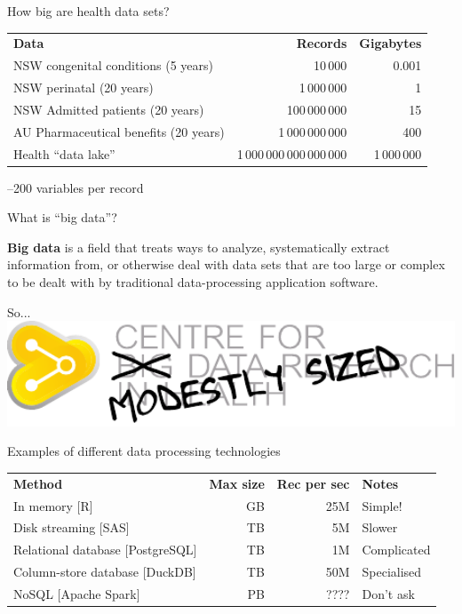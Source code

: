 \documentclass[aspectratio=169,12pt,usepdftitle=false]{beamer} %
\begin{document}

\begin{frame}{How big are health data sets?}
    \begin{tabular}{lrr}
	\textbf{Data} & \textbf{Records} & \textbf{Gigabytes} \\
	NSW congenital conditions (5 years)& 10\,000 & 0.001 \\
	NSW perinatal (20 years) & 1\,000\,000 & 1 \\
	NSW Admitted patients (20 years) & 100\,000\,000 & 15 \\
	AU Pharmaceutical benefits (20 years) & 1\,000\,000\,000 & 400 \\
	Health ``data lake'' & 1\,000\,000\,000\,000\,000 & 1\,000\,000 \\
    \end{tabular}\par
    --200 variables per record
\end{frame}

\begin{frame}{What is ``big data''?}
\centering
\begin{minipage}{0.8\textwidth}
\textbf{Big data} is a field that treats ways to analyze,
systematically extract information from, or otherwise deal with data sets
that are too large or complex to be dealt with by traditional
data-processing application software.
\end{minipage}
\end{frame}

\begin{frame}{So...}
\centering
\includegraphics[width=1.0\textwidth]
	{ref/cmsdrh.pdf}
\end{frame}

\begin{frame}{Examples of different data processing technologies}
    \begin{tabular}{lrrl}
	\textbf{Method} & \textbf{Max size} & \textbf{Rec per sec} &
		\textbf{Notes} \\
	In memory [R] & GB & 25M & Simple! \\
	Disk streaming [SAS] & TB & 5M & Slower \\
	Relational database [PostgreSQL] & TB & 1M & Complicated \\
	Column-store database [DuckDB] & TB & 50M & Specialised \\
	NoSQL [Apache Spark] & PB & ???? & Don't ask \\
    \end{tabular}
\end{frame}
\end{document}
